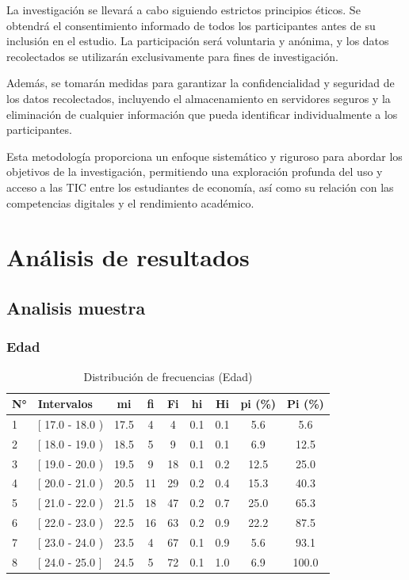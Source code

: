 \documentclass[12pt, a4paper]{article}
\begin{document}
La investigación se llevará a cabo siguiendo estrictos principios éticos. Se obtendrá el consentimiento informado de todos los participantes antes de su inclusión en el estudio. La participación será voluntaria y anónima, y los datos recolectados se utilizarán exclusivamente para fines de investigación. 

Además, se tomarán medidas para garantizar la confidencialidad y seguridad de los datos recolectados, incluyendo el almacenamiento en servidores seguros y la eliminación de cualquier información que pueda identificar individualmente a los participantes.

Esta metodología proporciona un enfoque sistemático y riguroso para abordar los objetivos de la investigación, permitiendo una exploración profunda del uso y acceso a las TIC entre los estudiantes de economía, así como su relación con las competencias digitales y el rendimiento académico.

\section{Análisis de resultados}

\subsection{Analisis muestra}

\subsubsection{Edad}

\begin{table}[H]

    \begin{tabular}{llccccccc}
        \toprule
        \textbf{N°} & \textbf{Intervalos} & \textbf{mi} & \textbf{fi} & \textbf{Fi} & \textbf{hi} & \textbf{Hi} & \textbf{pi (\%)} & \textbf{Pi (\%)} \\
        \midrule
        1 & [ 17.0 - 18.0 ) & 17.5 & 4  & 4  & 0.1 & 0.1 & 5.6  & 5.6  \\
        2 & [ 18.0 - 19.0 ) & 18.5 & 5  & 9  & 0.1 & 0.1 & 6.9  & 12.5 \\
        3 & [ 19.0 - 20.0 ) & 19.5 & 9  & 18 & 0.1 & 0.2 & 12.5 & 25.0 \\
        4 & [ 20.0 - 21.0 ) & 20.5 & 11 & 29 & 0.2 & 0.4 & 15.3 & 40.3 \\
        5 & [ 21.0 - 22.0 ) & 21.5 & 18 & 47 & 0.2 & 0.7 & 25.0 & 65.3 \\
        6 & [ 22.0 - 23.0 ) & 22.5 & 16 & 63 & 0.2 & 0.9 & 22.2 & 87.5 \\
        7 & [ 23.0 - 24.0 ) & 23.5 & 4  & 67 & 0.1 & 0.9 & 5.6  & 93.1 \\
        8 & [ 24.0 - 25.0 ] & 24.5 & 5  & 72 & 0.1 & 1.0 & 6.9  & 100.0 \\
        \bottomrule
    \end{tabular}
    \vspace{0.1cm}
    \centering
    \caption{Distribución de frecuencias (Edad)}
    \label{tab:frecuencias}
\end{table}
\end{document}

